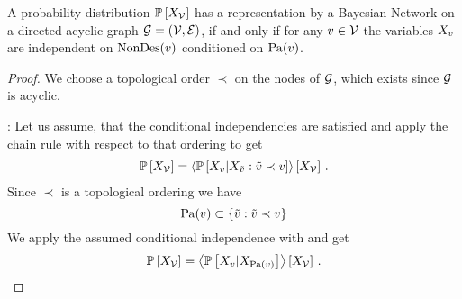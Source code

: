 \begin{theorem}
    \label{the:condIndBN}
    A probability distribution $\mathbb{P}\left[X_{\mathcal{V}}\right]$ has a representation by a Bayesian Network on a directed acyclic graph $\mathcal{G}=(\mathcal{V},\mathcal{E})$, if and only if for any $v\in\mathcal{V}$ the variables $X_{v}$ are independent on $\mathrm{NonDes}(v)$ conditioned on $\mathrm{Pa}(v)$.
\end{theorem}
\begin{proof}
    We choose a topological order $\prec$ on the nodes of $\mathcal{G}$, which exists since $\mathcal{G}$ is acyclic.

    \proofrightsymbol:
    Let us assume, that the conditional independencies are satisfied and apply the chain rule with respect to that ordering to get
    \begin{align*}
        \mathbb{P}\left[X_{\mathcal{V}}\right] =
        \left\langle 
            \mathbb{P}\left[X_{v}|X_{\tilde{v}} : \tilde{v} \prec v\right]
        \right\rangle \left[ X_{\mathcal{V}} \right] \, .
    \end{align*}
    Since $\prec$ is a topological ordering we have
    \[ \mathrm{Pa}(v) \subset \{\tilde{v} : \tilde{v} \prec v\} \]
    We apply the assumed conditional independence with  and get
    \begin{align*}
        \mathbb{P}\left[X_{\mathcal{V}}\right] =
        \left\langle 
            \mathbb{P}\left[X_{v}|X_{\mathrm{Pa}(v)}\right]
        \right\rangle \left[ X_{\mathcal{V}} \right] \, .
    \end{align*}


\end{proof}
